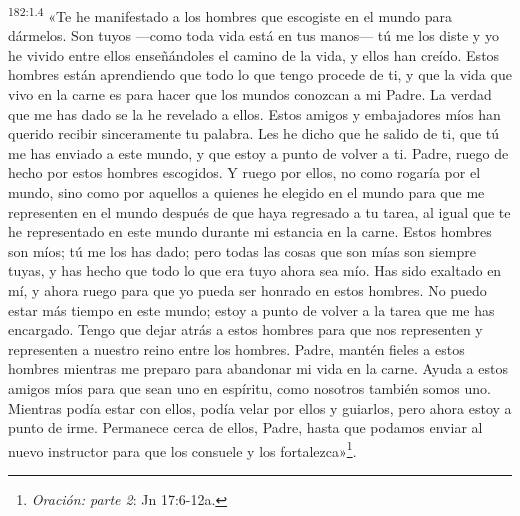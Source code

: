 \par
\textsuperscript{182:1.4} «Te he manifestado a los hombres que escogiste en el mundo para dármelos. Son tuyos ---como toda vida está en tus manos--- tú me los diste y yo he vivido entre ellos enseñándoles el camino de la vida, y ellos han creído. Estos hombres están aprendiendo que todo lo que tengo procede de ti, y que la vida que vivo en la carne es para hacer que los mundos conozcan a mi Padre. La verdad que me has dado se la he revelado a ellos. Estos amigos y embajadores míos han querido recibir sinceramente tu palabra. Les he dicho que he salido de ti, que tú me has enviado a este mundo, y que estoy a punto de volver a ti. Padre, ruego de hecho por estos hombres escogidos. Y ruego por ellos, no como rogaría por el mundo, sino como por aquellos a quienes he elegido en el mundo para que me representen en el mundo después de que haya regresado a tu tarea, al igual que te he representado en este mundo durante mi estancia en la carne. Estos hombres son míos; tú me los has dado; pero todas las cosas que son mías son siempre tuyas, y has hecho que todo lo que era tuyo ahora sea mío. Has sido exaltado en mí, y ahora ruego para que yo pueda ser honrado en estos hombres. No puedo estar más tiempo en este mundo; estoy a punto de volver a la tarea que me has encargado. Tengo que dejar atrás a estos hombres para que nos representen y representen a nuestro reino entre los hombres. Padre, mantén fieles a estos hombres mientras me preparo para abandonar mi vida en la carne. Ayuda a estos amigos míos para que sean uno en espíritu, como nosotros también somos uno. Mientras podía estar con ellos, podía velar por ellos y guiarlos, pero ahora estoy a punto de irme. Permanece cerca de ellos, Padre, hasta que podamos enviar al nuevo instructor para que los consuele y los fortalezca»\footnote{\textit{Oración: parte 2}: Jn 17:6-12a.}.

